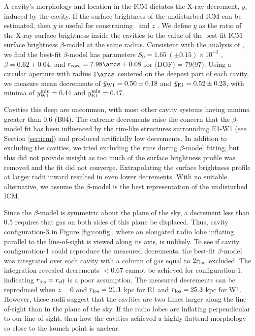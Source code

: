 \documentclass[iop]{emulateapj}
\begin{document}
A cavity's morphology and location in the ICM dictates the X-ray
decrement, $y$, induced by the cavity. If the surface brightness of
the undisturbed ICM can be estimated, then $y$ is useful for
constraining \rlos\ and $z$ \citep[see][for details]{hydraa}. We
define $y$ as the ratio of the X-ray surface brightness inside the
cavities to the value of the best-fit ICM surface brightness
$\beta$-model at the same radius. Consistent with the analysis of
\citet{schindler01}, we find the best-fit $\beta$-model has parameters
$S_0 = 1.65 ~(\pm 0.15) \times 10^{-3}$ \sbr, $\beta = 0.62 \pm 0.04$,
and $r_{\rm{core}} = 7.98\arcs \pm 0.08$ for \chisq(DOF) =
79(97). Using a circular aperture with radius $1\arcs$ centered on the
deepest part of each cavity, we measure mean decrements of
$\bar{y}_{\rm{W1}} = 0.50 \pm 0.18$ and $\bar{y}_{\rm{E1}} = 0.52 \pm
0.23$, with minima of $y^{\rm{min}}_{\rm{W1}} = 0.44$ and
$y^{\rm{min}}_{\rm{E1}} = 0.47$.

Cavities this deep are uncommon, with most other cavity systems having
minima greater than 0.6 (B04). The extreme decrements raise the
concern that the $\beta$-model fit has been influenced by the rim-like
structures surrounding E1-W1 (see Section \ref{sec:icm}) and produced
artificially low decrements. In addition to excluding the cavities, we
tried excluding the rims during $\beta$-model fitting, but this did
not provide insight as too much of the surface brightness profile was
removed and the fit did not converge. Extrapolating the surface
brightness profile at larger radii inward resulted in even lower
decrements. With no suitable alternative, we assume the $\beta$-model
is the best representation of the undisturbed ICM.

Since the $\beta$-model is symmetric about the plane of the sky, a
decrement less than 0.5 requires that gas on both sides of this plane
be displaced. Thus, cavity configuration-3 in Figure \ref{fig:config},
where an elongated radio lobe inflating parallel to the line-of-sight
is viewed along its axis, is unlikely. To see if cavity
configuration-1 could reproduce the measured decrements, the best-fit
$\beta$-model was integrated over each cavity with a column of gas
equal to $2r_{\rm{los}}$ excluded. The integration revealed decrements $<
0.67$ cannot be achieved for configuration-1, indicating $r_{\rm{los}} =
r_{\rm{eff}}$ is a poor assumption. The measured decrements can be reproduced
when $z = 0$ and $r_{\rm{los}} = 21.1$ kpc for E1 and $r_{\rm{los}} = 25.3$ kpc for
W1. However, these radii suggest that the cavities are two times
larger along the line-of-sight than in the plane of the sky. If the
radio lobes are inflating perpendicular to our line-of-sight, then how
the cavities achieved a highly flattend morphology so close to the
launch point is unclear.
\end{document}
